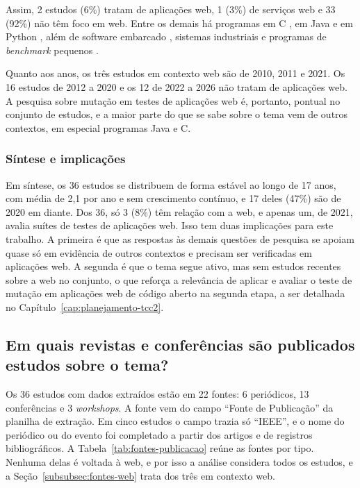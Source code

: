 Assim, 2 estudos (6\%) tratam de aplicações web, 1 (3\%) de serviços web e 33 (92\%) não têm foco em web. Entre os demais há programas em C \cite{yao2014, zhang2010, kurtz2016, kuroishi2020}, em Java \cite{zhang2019, guizzo2022, ashong2025} e em Python \cite{guerino2024}, além de software embarcado \cite{he2024}, sistemas industriais \cite{petrovic2021} e programas de \textit{benchmark} pequenos \cite{arasteh2022, arasteh2023}.

Quanto aos anos, os três estudos em contexto web são de 2010, 2011 e 2021. Os 16 estudos de 2012 a 2020 e os 12 de 2022 a 2026 não tratam de aplicações web. A pesquisa sobre mutação em testes de aplicações web é, portanto, pontual no conjunto de estudos, e a maior parte do que se sabe sobre o tema vem de outros contextos, em especial programas Java e C.

\subsubsection{Síntese e implicações}
\label{subsubsec:sintese-distribuicao}

Em síntese, os 36 estudos se distribuem de forma estável ao longo de 17 anos, com média de 2,1 por ano e sem crescimento contínuo, e 17 deles (47\%) são de 2020 em diante. Dos 36, só 3 (8\%) têm relação com a web, e apenas um, de 2021, avalia suítes de testes de aplicações web. Isso tem duas implicações para este trabalho. A primeira é que as respostas às demais questões de pesquisa se apoiam quase só em evidência de outros contextos e precisam ser verificadas em aplicações web. A segunda é que o tema segue ativo, mas sem estudos recentes sobre a web no conjunto, o que reforça a relevância de aplicar e avaliar o teste de mutação em aplicações web de código aberto na segunda etapa, a ser detalhada no Capítulo~\ref{cap:planejamento-tcc2}.

\subsection{Em quais revistas e conferências são publicados estudos sobre o tema?}
\label{subsec:revistas-conferencias}

Os 36 estudos com dados extraídos estão em 22 fontes: 6 periódicos, 13 conferências e 3 \textit{workshops}. A fonte vem do campo ``Fonte de Publicação'' da planilha de extração. Em cinco estudos o campo trazia só ``IEEE'', e o nome do periódico ou do evento foi completado a partir dos artigos e de registros bibliográficos. A Tabela~\ref{tab:fontes-publicacao} reúne as fontes por tipo. Nenhuma delas é voltada à web, e por isso a análise considera todos os estudos, e a Seção~\ref{subsubsec:fontes-web} trata dos três em contexto web.

